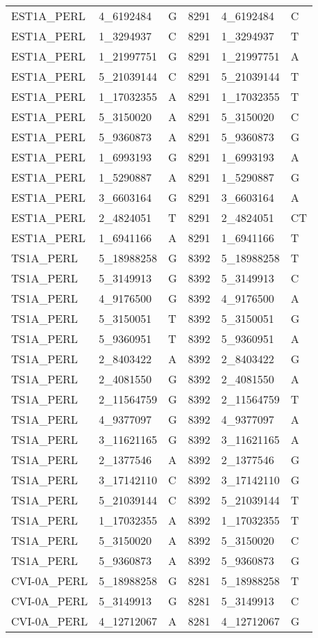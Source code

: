 \begin{center}
\begin{longtable}{|l|l|l|l|l|l|}
EST1A\_PERL&4\_6192484&G&8291&4\_6192484&C\\
EST1A\_PERL&1\_3294937&C&8291&1\_3294937&T\\
EST1A\_PERL&1\_21997751&G&8291&1\_21997751&A\\
EST1A\_PERL&5\_21039144&C&8291&5\_21039144&T\\
EST1A\_PERL&1\_17032355&A&8291&1\_17032355&T\\
EST1A\_PERL&5\_3150020&A&8291&5\_3150020&C\\
EST1A\_PERL&5\_9360873&A&8291&5\_9360873&G\\
EST1A\_PERL&1\_6993193&G&8291&1\_6993193&A\\
EST1A\_PERL&1\_5290887&A&8291&1\_5290887&G\\
EST1A\_PERL&3\_6603164&G&8291&3\_6603164&A\\
EST1A\_PERL&2\_4824051&T&8291&2\_4824051&CT\\
EST1A\_PERL&1\_6941166&A&8291&1\_6941166&T\\
TS1A\_PERL&5\_18988258&G&8392&5\_18988258&T\\
TS1A\_PERL&5\_3149913&G&8392&5\_3149913&C\\
TS1A\_PERL&4\_9176500&G&8392&4\_9176500&A\\
TS1A\_PERL&5\_3150051&T&8392&5\_3150051&G\\
TS1A\_PERL&5\_9360951&T&8392&5\_9360951&A\\
TS1A\_PERL&2\_8403422&A&8392&2\_8403422&G\\
TS1A\_PERL&2\_4081550&G&8392&2\_4081550&A\\
TS1A\_PERL&2\_11564759&G&8392&2\_11564759&T\\
TS1A\_PERL&4\_9377097&G&8392&4\_9377097&A\\
TS1A\_PERL&3\_11621165&G&8392&3\_11621165&A\\
TS1A\_PERL&2\_1377546&A&8392&2\_1377546&G\\
TS1A\_PERL&3\_17142110&C&8392&3\_17142110&G\\
TS1A\_PERL&5\_21039144&C&8392&5\_21039144&T\\
TS1A\_PERL&1\_17032355&A&8392&1\_17032355&T\\
TS1A\_PERL&5\_3150020&A&8392&5\_3150020&C\\
TS1A\_PERL&5\_9360873&A&8392&5\_9360873&G\\
CVI-0A\_PERL&5\_18988258&G&8281&5\_18988258&T\\
CVI-0A\_PERL&5\_3149913&G&8281&5\_3149913&C\\
CVI-0A\_PERL&4\_12712067&A&8281&4\_12712067&G\\

\end{longtable}
\end{center}
